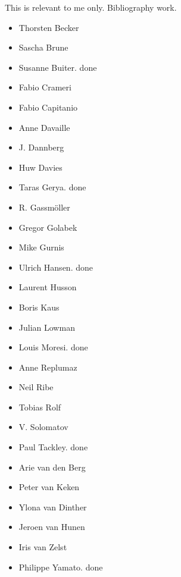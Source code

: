 
This is relevant to me only. Bibliography work.
\begin{itemize}
\item Thorsten Becker
\item Sascha Brune
\item Susanne Buiter. done
\item Fabio Crameri
\item Fabio Capitanio
\item Anne Davaille
\item J. Dannberg
\item Huw Davies
\item Taras Gerya. done
\item R. Gassm\"oller
\item Gregor Golabek
\item Mike Gurnis
\item Ulrich Hansen. done
\item Laurent Husson
\item Boris Kaus 
\item Julian Lowman
\item Louis Moresi. done
\item Anne Replumaz
\item Neil Ribe
\item Tobias Rolf
\item V. Solomatov 
\item Paul Tackley. done
\item Arie van den Berg
\item Peter van Keken 
\item Ylona van Dinther
\item Jeroen van Hunen
\item Iris van Zelst
\item Philippe Yamato. done
\end{itemize}
